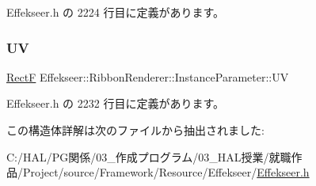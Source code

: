  Effekseer.\+h の 2224 行目に定義があります。

\mbox{\label{struct_effekseer_1_1_ribbon_renderer_1_1_instance_parameter_ae15daebe5ddca6f33083976153344531}} 
\subsubsection{\texorpdfstring{UV}{UV}}
{\footnotesize\ttfamily \mbox{\hyperlink{struct_effekseer_1_1_rect_f}{RectF}} Effekseer\+::\+Ribbon\+Renderer\+::\+Instance\+Parameter\+::\+UV}



 Effekseer.\+h の 2232 行目に定義があります。



この構造体詳解は次のファイルから抽出されました\+:\begin{DoxyCompactItemize}
\item 
C\+:/\+H\+A\+L/\+P\+G関係/03\+\_\+作成プログラム/03\+\_\+\+H\+A\+L授業/就職作品/\+Project/source/\+Framework/\+Resource/\+Effekseer/\mbox{\hyperlink{_effekseer_8h}{Effekseer.\+h}}\end{DoxyCompactItemize}
